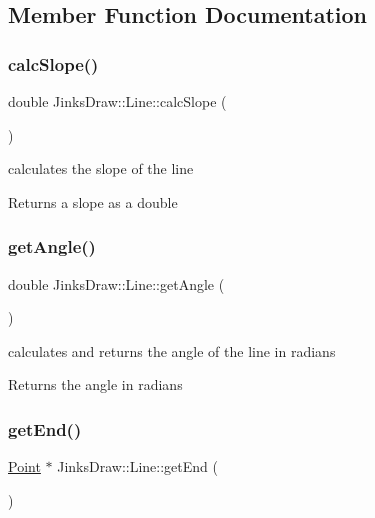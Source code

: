 \subsection{Member Function Documentation}
\mbox{\label{class_jinks_draw_1_1_line_aea73a9418815e5d255044a6dbce37e3e}} 
\subsubsection{\texorpdfstring{calc\+Slope()}{calcSlope()}}
{\footnotesize\ttfamily double Jinks\+Draw\+::\+Line\+::calc\+Slope (\begin{DoxyParamCaption}{ }\end{DoxyParamCaption})}



calculates the slope of the line 

\begin{DoxyReturn}{Returns}
a slope as a double 
\end{DoxyReturn}
\mbox{\label{class_jinks_draw_1_1_line_ae344d8ad62e6044cfa2a5d31e1262d00}} 
\subsubsection{\texorpdfstring{get\+Angle()}{getAngle()}}
{\footnotesize\ttfamily double Jinks\+Draw\+::\+Line\+::get\+Angle (\begin{DoxyParamCaption}{ }\end{DoxyParamCaption})}



calculates and returns the angle of the line in radians 

\begin{DoxyReturn}{Returns}
the angle in radians 
\end{DoxyReturn}
\mbox{\label{class_jinks_draw_1_1_line_a6d0c3c1b398bbe5dcadecaff9e71720b}} 
\subsubsection{\texorpdfstring{get\+End()}{getEnd()}}
{\footnotesize\ttfamily \mbox{\hyperlink{class_jinks_draw_1_1_point}{Point}} $\ast$ Jinks\+Draw\+::\+Line\+::get\+End (\begin{DoxyParamCaption}{ }\end{DoxyParamCaption})}



